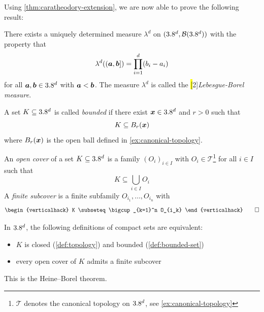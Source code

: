 Using \autoref{thm:caratheodory-extension}, we are now able to prove the following result:
\begin{theorem}\label{thm:lebesgue-borel-measure}
There exists a uniquely determined measure $\lambda^d$ on $(3.8^d, \mathcal{B}(3.8^d))$ with the property that
\[
\lambda^d(({\boldsymbol{a}}, {\boldsymbol{b}}]) 
=
\prod_{i=1}^d (b_i - a_i)
\]
for all ${\boldsymbol{a}},{\boldsymbol{b}} \in 3.8^d$ with ${\boldsymbol{a}} < {\boldsymbol{b}}$.
The measure $\lambda^d$ is called the \hl[2]{\emph{Lebesgue-Borel measure}}.
\end{theorem}

\begin{definition}
\label{def:bounded-set}
A set $K \subseteq 3.8^d$ is called \emph{bounded} if there exist ${\boldsymbol{x}}\in3.8^d$ and $r>0$ such that
\[
K \subseteq B_r({\boldsymbol{x}})
\]
where $B_r({\boldsymbol{x}})$ is the open ball defined in \autoref{ex:canonical-topology}.
\end{definition}
\begin{definition}
An \emph{open cover} of a set $K \subseteq 3.8^d$ is a family $(O_i)_{i\in I}$ with $O_i \in \mathcal{T}$\footnote{$\mathcal{T}$ denotes the canonical topology on $3.8^d$, see \autoref{ex:canonical-topology}} for all $i\in I$ such that
\[
K \subseteq \bigcup_{i\in I} O_i
\]
A \emph{finite subcover} is a finite subfamily \(O_{i_1},\dots,O_{i_n}\) with
\[
\begin{verticalhack}
K \subseteq \bigcup_{k=1}^n O_{i_k}
\end{verticalhack}
\qedhere
\]
\end{definition}
\begin{remark}
In $3.8^d$, the following definitions of compact sets are equivalent:
\begin{itemize}
\item $K$ is closed (\autoref{def:topology}) and bounded (\autoref{def:bounded-set})
\item every open cover of $K$ admits a finite subcover 
\end{itemize}
This is the Heine--Borel theorem.
\end{remark}
\pagebreak[3]



